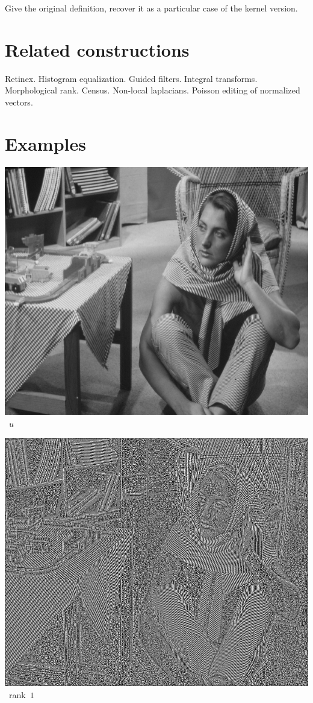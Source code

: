 \documentclass[12pt]{article}                  %
\begin{document}
Give the original definition, recover it as a particular case of the kernel
version.

\section{Related constructions}

Retinex.  Histogram equalization.  Guided filters.  Integral transforms.
Morphological rank.  Census.  Non-local laplacians.  Poisson editing of
normalized vectors.

\section{Examples}

\includegraphics[width=0.8\linewidth]{f/gbarbara.png}~$u$

\includegraphics[width=0.8\linewidth]{f/barbara_rank1.png}~rank~$1$
\end{document}
